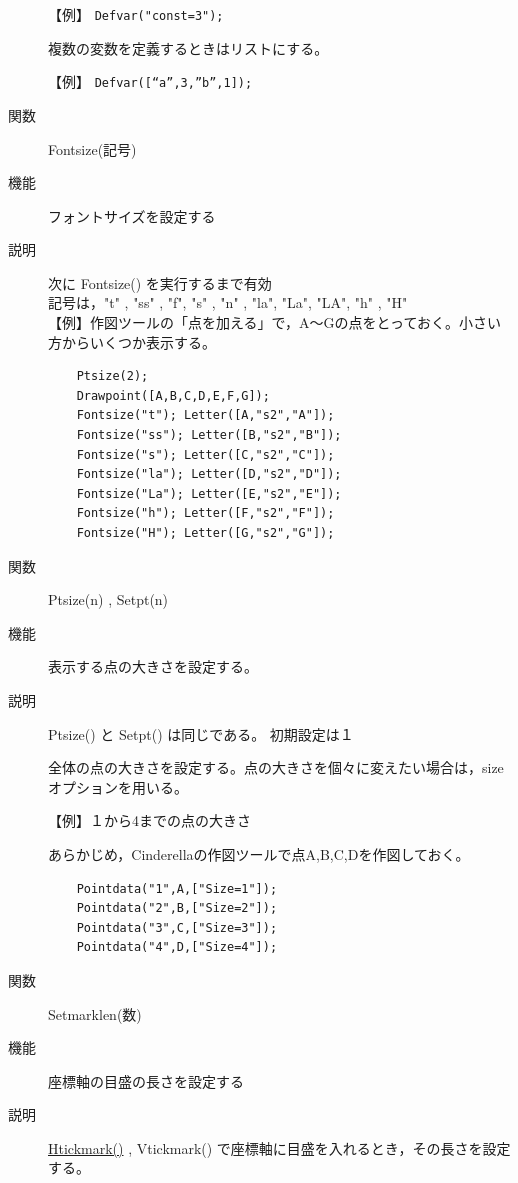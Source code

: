 \documentclass[papersize,a4paper,12pt,uplatex]{jsarticle}
\begin{document}
\begin{description}
【例】  \verb|Defvar("const=3");|

\vspace{\baselineskip}
  複数の変数を定義するときはリストにする。
  
【例】  \verb|Defvar([“a”,3,”b”,1]);|

\vspace{\baselineskip}
\hypertarget{fontsize}{}
\item[関数]  Fontsize(記号)
\item[機能]  フォントサイズを設定する
\item[説明]  次に Fontsize() を実行するまで有効\\
  記号は，"t" , "ss" , "f", "s" , "n" , "la",  "La", "LA", "h" , "H"\\

【例】作図ツールの「点を加える」で，A〜Gの点をとっておく。小さい方からいくつか表示する。
\begin{verbatim}
    Ptsize(2);
    Drawpoint([A,B,C,D,E,F,G]);
    Fontsize("t"); Letter([A,"s2","A"]);
    Fontsize("ss"); Letter([B,"s2","B"]);
    Fontsize("s"); Letter([C,"s2","C"]);
    Fontsize("la"); Letter([D,"s2","D"]);
    Fontsize("La"); Letter([E,"s2","E"]);
    Fontsize("h"); Letter([F,"s2","F"]);
    Fontsize("H"); Letter([G,"s2","G"]);
\end{verbatim}


\vspace{\baselineskip}
\hypertarget{setpt}{}
\hypertarget{ptsize}{}
\item[関数]  Ptsize(n) , Setpt(n)
\item[機能]  表示する点の大きさを設定する。
\item[説明]  Ptsize() と Setpt() は同じである。 初期設定は１

全体の点の大きさを設定する。点の大きさを個々に変えたい場合は，sizeオプションを用いる。

\vspace{\baselineskip}
【例】１から4までの点の大きさ

あらかじめ，Cinderellaの作図ツールで点A,B,C,Dを作図しておく。
\begin{verbatim}
    Pointdata("1",A,["Size=1"]);
    Pointdata("2",B,["Size=2"]);
    Pointdata("3",C,["Size=3"]);
    Pointdata("4",D,["Size=4"]);
\end{verbatim}
\hspace{10mm}

\hypertarget{setmarklen}{}
\item[関数]  Setmarklen(数)  
\item[機能]  座標軸の目盛の長さを設定する
\item[説明]   \hyperlink{htickmark}{Htickmark()} , Vtickmark() で座標軸に目盛を入れるとき，その長さを設定する。 


\end{description}
\end{document}
